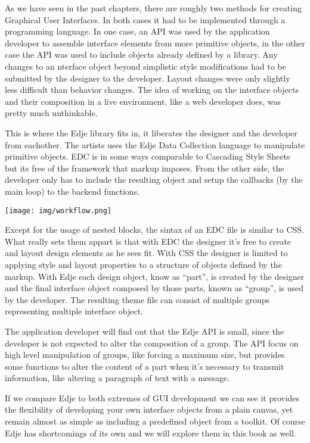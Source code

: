 \documentclass[12pt,a4paper,english]{book}
\begin{document}
As we have seen in the past chapters, there are roughly two methods for
creating Graphical User Interfaces. In both cases it had to be implemented
through a programming language. In one case, an API was used by the application
developer to assemble interface elements from more primitive objects, in the
other case the API was used to include objects already defined by a library.
Any changes to an nterface object beyond simplistic style modifications had to
be submitted by the designer to the developer. Layout changes were only
slightly less difficult than behavior changes. The idea of working on the
interface objects and their composition in a live environment, like a web
developer does, was pretty much unthinkable.

This is where the Edje library fits in, it liberates the designer and the
developer from eachother. The artists uses the Edje Data Collection language to
manipulate primitive objects. EDC is in some ways comparable to Cascading Style
Sheets but its free of the framework that markup imposes. From the other side,
the developer only has to include the resulting object and setup the callbacks
(by the main loop) to the backend functions.

{\hfill\texttt{[image: img/workflow.png]}\hfill}

Except for the usage of nested blocks, the sintax of an EDC file is similar to
CSS. What really sets them appart is that with EDC the designer it's free to
create and layout design elements as he sees fit. With CSS the designer is
limited to applying style and layout properties to a structure of objects
defined by the markup. With Edje each design object, know as ``part'', is created
by the designer and the final interface object composed by those parts, known
as ``group'', is used by the developer. The resulting theme file can consist of
multiple groups representing multiple interface object.

The application developer will find out that the Edje API is small, since the
developer is not expected to alter the composition of a group. The API focus on
high level manipulation of groups, like forcing a maximum size, but provides
some functions to alter the content of a part when it's necessary to transmit
information, like altering a paragraph of text with a message.

If we compare Edje to both extremes of GUI development we can see it provides
the flexibility of developing your own interface objects from a plain canvas,
yet remain almost as simple as including a predefined object from a toolkit. Of
course Edje has shortcomings of its own and we will explore them in this book
as well.
\end{document}
